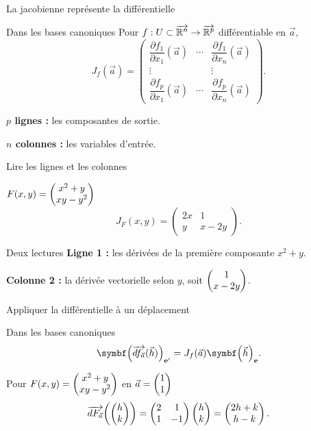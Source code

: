 \begin{frame}[t]{La jacobienne représente la différentielle}
\coursanalyse
\begin{notion}{Dans les bases canoniques}
Pour $f:U\subset\overrightarrow{\mathbb R^{n}}\to\overrightarrow{\mathbb R^{p}}$ différentiable en $\vec a$,
\[J_f(\vec a)=\begin{pmatrix}
\dfrac{\partial f_1}{\partial x_1}(\vec a)&\cdots&\dfrac{\partial f_1}{\partial x_n}(\vec a)\\
\vdots&&\vdots\\
\dfrac{\partial f_p}{\partial x_1}(\vec a)&\cdots&\dfrac{\partial f_p}{\partial x_n}(\vec a)
\end{pmatrix}.\]
\end{notion}
\vfill\textbf{$p$ lignes :} les composantes de sortie.

\medskip
\textbf{$n$ colonnes :} les variables d'entrée.
\end{frame}

\begin{frame}[t]{Lire les lignes et les colonnes}
\coursanalyse
\begin{exemple}{$F(x,y)=\begin{pmatrix}x^2+y\\xy-y^2\end{pmatrix}$}
\[J_F(x,y)=\begin{pmatrix}2x&1\\y&x-2y\end{pmatrix}.\]
\end{exemple}
\begin{cours}{Deux lectures}
\textbf{Ligne 1 :} les dérivées de la première composante $x^2+y$.

\medskip
\textbf{Colonne 2 :} la dérivée vectorielle selon $y$, soit $\begin{pmatrix}1\\x-2y\end{pmatrix}$.
\end{cours}
\end{frame}

\begin{frame}[t]{Appliquer la différentielle à un déplacement}
\coursanalyse
\begin{theoreme}{Dans les bases canoniques}
\[\coord{\df f{\vec a}(\vec h)}{\mathbf e'}=J_f(\vec a)\coord{\vec h}{\mathbf e}.\]
\end{theoreme}
\begin{exemple}{Pour $F(x,y)=\begin{pmatrix}x^2+y\\xy-y^2\end{pmatrix}$ en $\vec a=\begin{pmatrix}1\\1\end{pmatrix}$}
\[\overrightarrow{dF_{\vec a}}\!\left(\begin{pmatrix}h\\k\end{pmatrix}\right)
=\begin{pmatrix}2&1\\1&-1\end{pmatrix}\begin{pmatrix}h\\k\end{pmatrix}=\begin{pmatrix}2h+k\\h-k\end{pmatrix}.\]
\end{exemple}
\end{frame}

